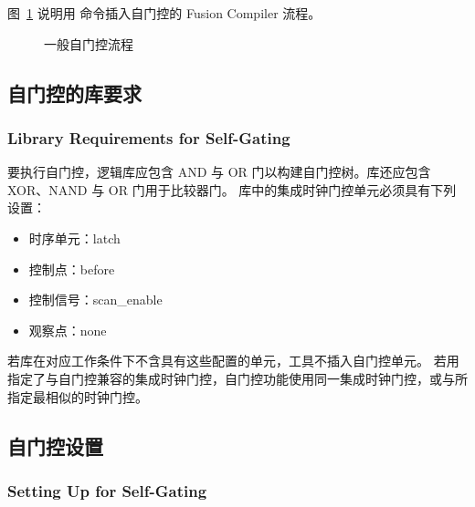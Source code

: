 图~\ref{fig:cg-self-flow} 说明用  命令插入自门控的 Fusion Compiler 流程。

\begin{figure}[htbp]
\centering
{}
\caption{一般自门控流程}
\label{fig:cg-self-flow}
\end{figure}

\subsection{自门控的库要求}
\subsubsection*{Library Requirements for Self-Gating}

要执行自门控，逻辑库应包含 AND 与 OR 门以构建自门控树。库还应包含 XOR、NAND 与 OR 门用于比较器门。
库中的集成时钟门控单元必须具有下列设置：
\begin{itemize}
  \item 时序单元：latch
  \item 控制点：before
  \item 控制信号：scan\_enable
  \item 观察点：none
\end{itemize}

若库在对应工作条件下不含具有这些配置的单元，工具不插入自门控单元。
若用  指定了与自门控兼容的集成时钟门控，自门控功能使用同一集成时钟门控，或与所指定最相似的时钟门控。

\subsection{自门控设置}
\subsubsection*{Setting Up for Self-Gating}

